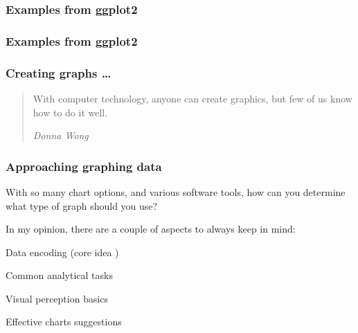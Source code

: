\documentclass[12pt]{beamer}\usepackage[]{graphicx}\usepackage[]{color}
\begin{document}
\begin{frame}
\frametitle{Examples from ggplot2}
\begin{center}
\end{center}
\end{frame}


\begin{frame}
\frametitle{Examples from ggplot2}
\begin{center}
\end{center}
\end{frame}


\begin{frame}
\begin{center}
\Huge{}
\end{center}
\end{frame}


\begin{frame}
\frametitle{Creating graphs \dots}

{\Large
\begin{quotation}
\noindent With computer technology, anyone can create graphics, but few of us know how to do it well.

\bigskip
{\small \noindent \textit{Donna Wong}}

\end{quotation}
}

\end{frame}


\begin{frame}
\frametitle{Approaching graphing data}

With so many chart options, and various software tools, how can you determine what type of graph should you use?

\bigskip

In my opinion, there are a couple of aspects to always keep in mind:

\bi
  \item Data encoding (core idea )
  \item Common analytical tasks
  \item Visual perception basics
  \item Effective charts suggestions
\ei

\end{frame}
\end{document}
